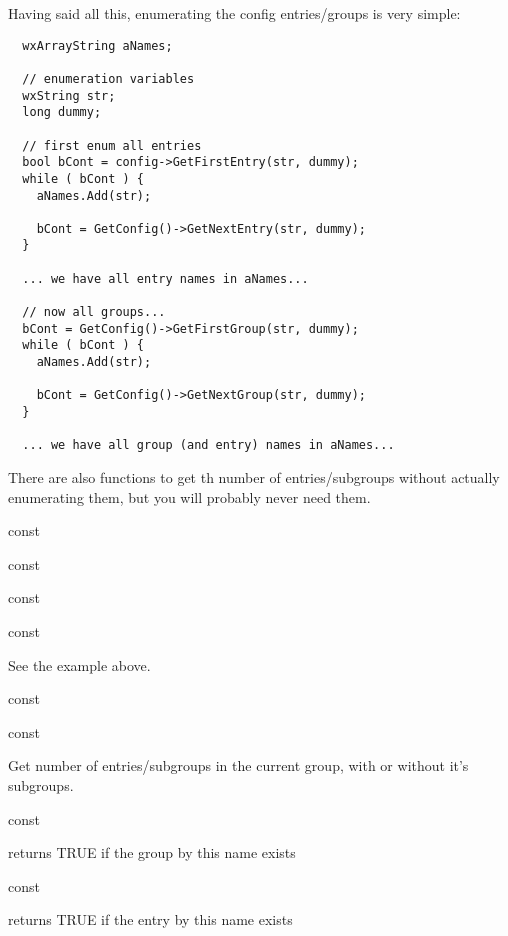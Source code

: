 Having said all this, enumerating the config entries/groups is very simple:

\begin{verbatim}
  wxArrayString aNames;

  // enumeration variables
  wxString str;
  long dummy;

  // first enum all entries
  bool bCont = config->GetFirstEntry(str, dummy);
  while ( bCont ) {
    aNames.Add(str);

    bCont = GetConfig()->GetNextEntry(str, dummy);
  }

  ... we have all entry names in aNames...

  // now all groups...
  bCont = GetConfig()->GetFirstGroup(str, dummy);
  while ( bCont ) {
    aNames.Add(str);

    bCont = GetConfig()->GetNextGroup(str, dummy);
  }

  ... we have all group (and entry) names in aNames...

\end{verbatim}

There are also functions to get th number of entries/subgroups without
actually enumerating them, but you will probably never need them.

 const

 const

 const

 const

See the example above.

 const

 const

Get number of entries/subgroups in the current group, with or without
it's subgroups.


 const

returns TRUE if the group by this name exists

 const

returns TRUE if the entry by this name exists

